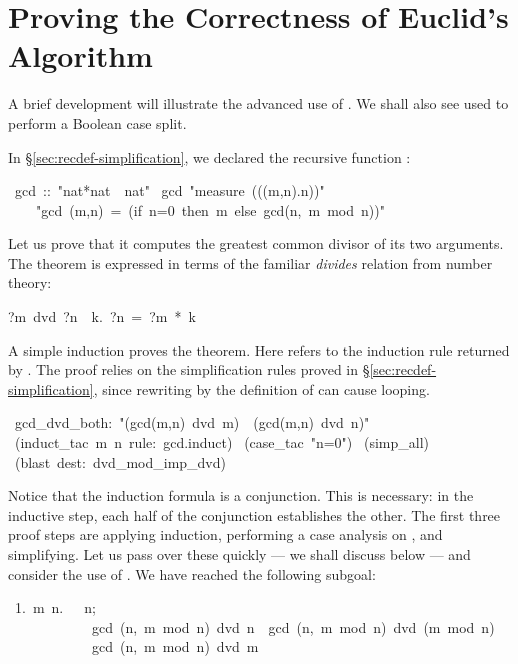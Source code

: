\section{Proving the Correctness of Euclid's Algorithm}
\label{sec:proving-euclid}

%
A brief development will illustrate the advanced use of  
.  We shall also see  used to perform a Boolean
case split.

In \S\ref{sec:recdef-simplification}, we declared the
recursive function :
\begin{isabelle}
\ gcd\ ::\ "nat*nat\ \isasymRightarrow\ nat"\isanewline
{}\ gcd\ "measure\ ((\isasymlambda(m,n).n))"\isanewline
\ \ \ \ "gcd\ (m,n)\ =\ (if\ n=0\ then\ m\ else\ gcd(n,\ m\ mod\ n))"
\end{isabelle}
Let us prove that it computes the greatest common
divisor of its two arguments.  
The theorem is expressed in terms of the familiar
\emph{divides} relation from number theory: 
\begin{isabelle}
?m\ dvd\ ?n\ \isasymequiv\ {\isasymexists}k.\ ?n\ =\ ?m\ *\ k
\end{isabelle}
%
A simple induction proves the theorem.  Here  refers to the
induction rule returned by .  The proof relies on the simplification
rules proved in \S\ref{sec:recdef-simplification}, since rewriting by the
definition of  can cause looping.
\begin{isabelle}
\ gcd_dvd_both:\ "(gcd(m,n)\ dvd\ m)\ \isasymand\ (gcd(m,n)\ dvd\ n)"\isanewline
{}\ (induct_tac\ m\ n\ rule:\ gcd.induct)\isanewline
{}\ (case_tac\ "n=0")\isanewline
{}\ (simp_all)\isanewline
{}\ (blast\ dest:\ dvd_mod_imp_dvd)\isanewline
{}%
\end{isabelle}
Notice that the induction formula 
is a conjunction.  This is necessary: in the inductive step, each 
half of the conjunction establishes the other. The first three proof steps 
are applying induction, performing a case analysis on , 
and simplifying.  Let us pass over these quickly --- we shall discuss
 below --- and consider the use of .  We have reached the
following  subgoal: 
\begin{isabelle}
\ 1.\ \isasymAnd m\ n.\ \ \isacharless\ n;\isanewline
 \ \ \ \ \ \ \ \ \ \ \ \ gcd\ (n,\ m\ mod\ n)\ dvd\ n\ \isasymand\ gcd\ (n,\ m\ mod\ n)\ dvd\ (m\ mod\ n)\isasymrbrakk\isanewline
\ \ \ \ \ \ \ \ \ \ \ \isasymLongrightarrow\ gcd\ (n,\ m\ mod\ n)\ dvd\ m
\end{isabelle}
